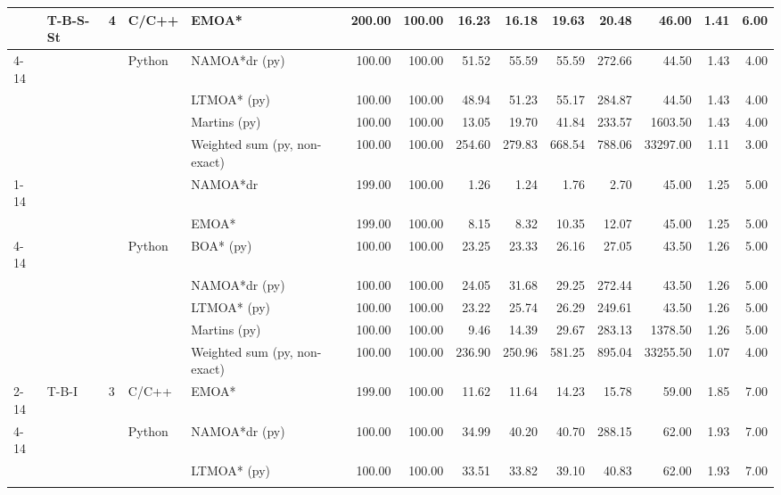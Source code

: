 \begin{table}
\begin{tabular}{lllllrrrrrrrrr}
{ & \multirow[t]{5}{*}{T-B-S-St} & \multirow[t]{5}{*}{4} & C/C++ & EMOA* & 200.00 & 100.00 & 16.23 & 16.18 & 19.63 & 20.48 & 46.00 & 1.41 & 6.00 \\
\cline{4-14}
 &  &  & \multirow[t]{4}{*}{Python} & NAMOA*dr (py) & 100.00 & 100.00 & 51.52 & 55.59 & 55.59 & 272.66 & 44.50 & 1.43 & 4.00 \\
 &  &  &  & LTMOA* (py) & 100.00 & 100.00 & 48.94 & 51.23 & 55.17 & 284.87 & 44.50 & 1.43 & 4.00 \\
 &  &  &  & Martins (py) & 100.00 & 100.00 & 13.05 & 19.70 & 41.84 & 233.57 & 1603.50 & 1.43 & 4.00 \\
 &  &  &  & Weighted sum (py, non-exact) & 100.00 & 100.00 & 254.60 & 279.83 & 668.54 & 788.06 & 33297.00 & 1.11 & 3.00 \\
\cline{1-14} \cline{2-14} \cline{3-14} \cline{4-14}
\multirow[t]{18}{*}{closed 3%
 &  &  &  & NAMOA*dr & 199.00 & 100.00 & 1.26 & 1.24 & 1.76 & 2.70 & 45.00 & 1.25 & 5.00 \\
 &  &  &  & EMOA* & 199.00 & 100.00 & 8.15 & 8.32 & 10.35 & 12.07 & 45.00 & 1.25 & 5.00 \\
\cline{4-14}
 &  &  & \multirow[t]{5}{*}{Python} & BOA* (py) & 100.00 & 100.00 & 23.25 & 23.33 & 26.16 & 27.05 & 43.50 & 1.26 & 5.00 \\
 &  &  &  & NAMOA*dr (py) & 100.00 & 100.00 & 24.05 & 31.68 & 29.25 & 272.44 & 43.50 & 1.26 & 5.00 \\
 &  &  &  & LTMOA* (py) & 100.00 & 100.00 & 23.22 & 25.74 & 26.29 & 249.61 & 43.50 & 1.26 & 5.00 \\
 &  &  &  & Martins (py) & 100.00 & 100.00 & 9.46 & 14.39 & 29.67 & 283.13 & 1378.50 & 1.26 & 5.00 \\
 &  &  &  & Weighted sum (py, non-exact) & 100.00 & 100.00 & 236.90 & 250.96 & 581.25 & 895.04 & 33255.50 & 1.07 & 4.00 \\
\cline{2-14} \cline{3-14} \cline{4-14}
 & \multirow[t]{5}{*}{T-B-I} & \multirow[t]{5}{*}{3} & C/C++ & EMOA* & 199.00 & 100.00 & 11.62 & 11.64 & 14.23 & 15.78 & 59.00 & 1.85 & 7.00 \\
\cline{4-14}
 &  &  & \multirow[t]{4}{*}{Python} & NAMOA*dr (py) & 100.00 & 100.00 & 34.99 & 40.20 & 40.70 & 288.15 & 62.00 & 1.93 & 7.00 \\
 &  &  &  & LTMOA* (py) & 100.00 & 100.00 & 33.51 & 33.82 & 39.10 & 40.83 & 62.00 & 1.93 & 7.00 \\
}}
\end{tabular}
\end{table}
